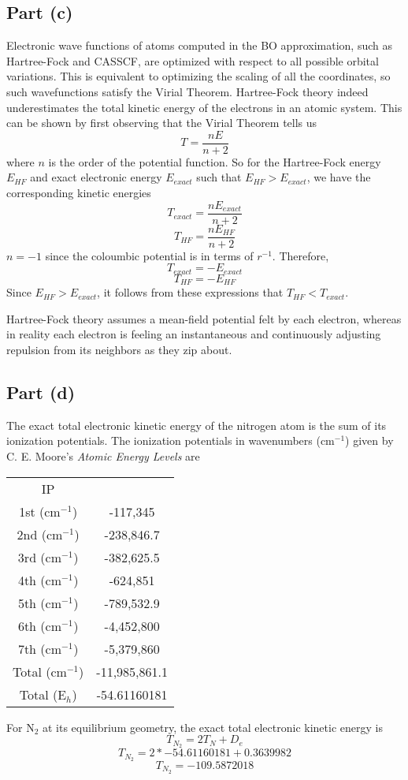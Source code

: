 \documentclass{article}
\begin{document}
\subsection{Part (c)}
Electronic wave functions of atoms computed in the BO approximation, such as Hartree-Fock and CASSCF, are optimized with respect 
to all possible orbital variations. This is equivalent to optimizing the scaling of all the coordinates, so such wavefunctions satisfy the Virial Theorem.
Hartree-Fock theory indeed underestimates the total kinetic energy of the electrons in an atomic system.
This can be shown by first observing that the Virial Theorem tells us
\[ T = \frac{nE}{n + 2} \]
where $n$ is the order of the potential function.
So for the Hartree-Fock energy $E_{HF}$ and exact electronic energy $E_{exact}$ such that $E_{HF} > E_{exact}$, we have the corresponding kinetic energies
\[ T_{exact} = \frac{nE_{exact}}{n + 2} \]
\[ T_{HF} = \frac{nE_{HF}}{n + 2} \]
$n = -1$ since the coloumbic potential is in terms of $r^{-1}$. Therefore,
\[ T_{exact} = -E_{exact} \]
\[ T_{HF} = -E_{HF}\]
Since $E_{HF} > E_{exact}$, it follows from these expressions that  $T_{HF} < T_{exact}$.

Hartree-Fock theory assumes a mean-field potential felt by each electron, whereas in reality each electron is feeling an instantaneous and continuously adjusting repulsion from its neighbors as they zip about.

\subsection{Part (d)}
The exact total electronic kinetic energy of the nitrogen atom is the sum of its ionization potentials.
The ionization potentials in wavenumbers (cm$^{-1}$) given by C. E. Moore's \textit{Atomic Energy Levels} are
\begin{table}
\begin{tabular}{cc}
IP &  \\
1st (cm$^{-1}$)  & -117,345    \\ 
2nd (cm$^{-1}$)  & -238,846.7  \\
3rd (cm$^{-1}$)  & -382,625.5  \\
4th (cm$^{-1}$)  & -624,851    \\
5th (cm$^{-1}$)  & -789,532.9  \\
6th (cm$^{-1}$)  & -4,452,800   \\
7th (cm$^{-1}$)  & -5,379,860   \\
Total (cm$^{-1}$) & -11,985,861.1 \\
Total (E$_h$) & -54.61160181\\
\end{tabular}
\end{table}
For N$_2$ at its equilibrium geometry, the exact total electronic kinetic energy is
\[T_{N_{2}} = 2T_N + D_e \] 
\[T_{N_{2}} = 2 * -54.61160181 + 0.3639982 \]
\[T_{N_{2}} = -109.5872018 \]
\end{document}
